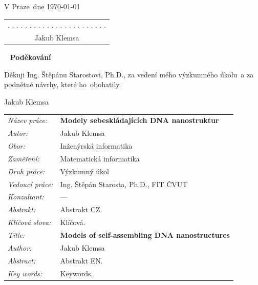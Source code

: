 \documentclass[a4paper, 11pt]{report}
\theoremstyle{definition}
\theoremstyle{remark}
\let\haluz\relax
\newcommand{\obor}{Inženýrská informatika}
\newcommand{\minf}{Matematická informatika}
\newcommand{\TypPrace}{Výzkumný úkol}
\newcommand{\mePrace}{mého výzkumného úkolu}
\newcommand{\rodPrace}{ho}
\newcommand{\nazevcz}{Modely sebeskládajících DNA nanostruktur}
\newcommand{\nazeven}{Models of self-assembling DNA nanostructures}
\newcommand{\autor}{Jakub Klemsa}
\newcommand{\vedouci}{Ing. Štěpán Starosta, Ph.D.}
\newcommand{\vedoucimu}{Ing. Štěpánu Starostovi, Ph.D.}
\newcommand{\pracovisteVed}{FIT ČVUT}
\newcommand{\konzultant}{---}
\newcommand{\vMiste}{Praze}
\newcommand{\klicova}{Klíčová.}
\newcommand{\keyword}{Keywords.}
\newcommand{\abstrCZ}{Abstrakt CZ.}
\newcommand{\abstrEN}{Abstrakt EN.}
\begin{document}
\begin{titlepage}
\noindent
\vspace{5mm}V \vMiste ~dne \today\hfill
	\begin{tabular}{c}
	. . . . . . . . . . . . . . . . . . . . . . .\\
	\autor
	\end{tabular}
\newpage


\thispagestyle{empty}
~
\vfill
\noindent\textbf{Poděkování}
\vspace{0.5cm}

\noindent
Děkuji \vedoucimu, za vedení \mePrace ~a za podnětné návrhy, které \rodPrace ~obohatily.

\begin{flushright}
\autor
\end{flushright}
\newpage


\thispagestyle{empty}

\begin{tabularx}{\textwidth}{lX}
  {\em Název práce:} & \bf \nazevcz \\[4mm]
  {\em Autor:} & \autor \\[4mm]
  {\em Obor:} & \obor \\[4mm]
  {\em Zaměření:} & \minf \\[4mm]
  {\em Druh práce:} & \TypPrace \\[4mm]
  {\em Vedoucí práce:} & \vedouci, \pracovisteVed \\[4mm]
  {\em Konzultant:} & \konzultant \\[4mm]
  {\em Abstrakt:} & \abstrCZ \\[4mm]
  {\em Klíčová slova:} & \klicova \\[20mm]

  {\em Title:} & \bf \nazeven \\[4mm]
  {\em Author:} & \autor \\[4mm]
  {\em Abstract:} & \abstrEN \\[4mm]
  {\em Key words:} & \keyword
\end{tabularx}
\newpage


\thispagestyle{empty}
\printnomenclature
\newpage


\tableofcontents
\thispagestyle{empty}

\end{titlepage}


		
		
		
		
		
		
		
		
		
\end{document}
